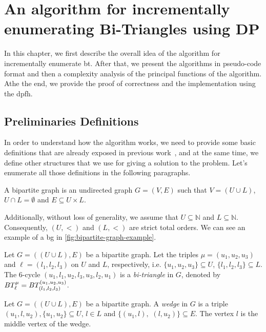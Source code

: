 \chapter{An algorithm for incrementally enumerating Bi-Triangles using DP}\label{incr-algo-bt-dp}
In this chapter, we first describe the overall idea of the algorithm for incrementally enumerate 
\acrshort{bt}. After that, we present the algorithms in pseudo-code format and then a complexity analysis of the principal functions of the algorithm.
Athe the end, we provide the proof of correctness and the implementation using the \acrshort{dpfh}.  

\section{Preliminaries Definitions}
In order to understand how the algorithm works, we need to provide some basic definitions that are already exposed in previous work~\cite{btcount}, and
at the same time, we define other structures that we use for giving a solution to the problem.
Let's enumerate all those definitions in the following paragraphs.

\begin{definition}[\acrlong{bg}] 
A bipartite graph is an undirected graph $G=(V,E)$  such that $V=(U\cup L)$, $U\cap L=\emptyset$ and $E\subseteq U\times L$.\cite{Bondy1976}
\end{definition}

Additionally, without loss of generality, we assume that  $U\subseteq \mathbb{N}$ and $L\subseteq \mathbb{N}$. Consequently, $(U,<)$  and $(L,<)$ are strict total orders. We can see an example of a \acrshort{bg}
in \autoref{fig:bipartite-graph-example}.

\begin{definition}[\acrlong{bt}]\label{def:bt}
Let $G=((U\cup L),E)$ be a bipartite graph. Let the triples $\mu=(u_1, u_2, u_3)$ and $\ell=(l_1, l_2,l_3)$ on $U$ and $L$, respectively, i.e.  $\{u_1, u_2, u_3\} \subseteq U$, $\{l_1, l_2,l_3\} \subseteq L$. 
The 6-cycle $(u_1,l_1,u_2,l_3,u_3,l_2,u_1)$  is a \textit{bi-triangle} in $G$, denoted by $BT_{\ell}^{\mu} = BT_{(l_1, l_2,l_3)}^{(u_1, u_2, u_3)}$. 
\end{definition}      

\begin{definition}[\acrfull{wg}]
Let $G=((U\cup L),E)$ be a bipartite graph. A  \textit{wedge} in $G$ is a triple $(u_1,l,u_2), \{u_1,u_2\}\subseteq U$, $l \in L$ and $\{(u_1,l),$ $(l,u_2)\} \subseteq E$. The vertex $l$ is the middle vertex of the wedge. 
\end{definition}

